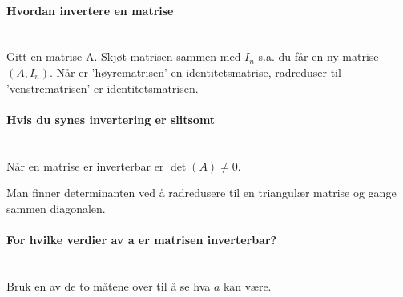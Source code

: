 \paragraph{Hvordan invertere en matrise} \mbox{} \\
Gitt en matrise A.
Skjøt matrisen sammen med $I_n$ s.a. du får en ny matrise $(A, I_n)$.
Når er 'høyrematrisen' en identitetsmatrise,
radreduser til 'venstrematrisen' er identitetsmatrisen.



\paragraph{Hvis du synes invertering er slitsomt} \mbox{} \\
Når en matrise er inverterbar er $\det (A) \neq 0$.

Man finner determinanten ved å radredusere til en triangulær matrise og
gange sammen diagonalen.



\paragraph{For hvilke verdier av a er matrisen inverterbar?} \mbox{} \\
Bruk en av de to måtene over til å se hva $a$ kan være.
